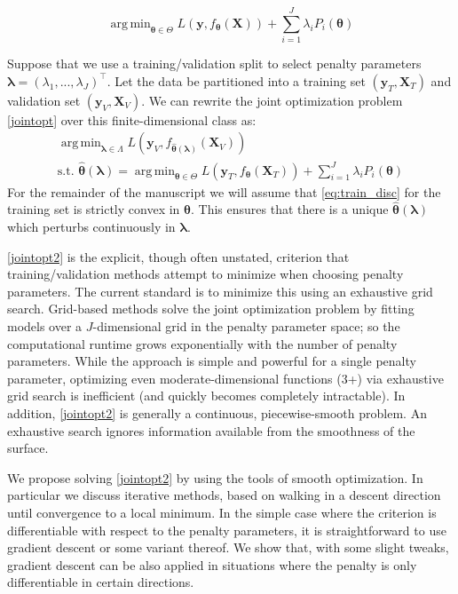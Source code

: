 \documentclass[12pt,letterpaper]{article}
\DeclareMathOperator*{\argmin}{arg\,min}
\begin{document}
\begin{equation}\label{eq:train_disc}
\argmin_{\boldsymbol \theta \in \Theta} L(\boldsymbol{y}, f_{\boldsymbol \theta}(\boldsymbol{X})) + \sum\limits_{i=1}^J \lambda_i P_i(\boldsymbol \theta)
\end{equation}

Suppose that we use a training/validation split to select penalty parameters $\boldsymbol{\lambda} = (\lambda_1, ..., \lambda_J)^\top$. Let the data be partitioned into a training set $(\boldsymbol{y}_T , \boldsymbol{X}_T)$ and validation set $(\boldsymbol{y}_V, \boldsymbol{X}_V)$. We can rewrite the joint optimization problem \eqref{jointopt} over this finite-dimensional class as:
\begin{equation}
\begin{array}{c}
\argmin_{\boldsymbol{\lambda} \in \Lambda} L(\boldsymbol{y}_V, f_{\hat{\boldsymbol \theta}(\boldsymbol{\lambda})}(\boldsymbol{X}_V)) \\
\text{s.t. } {\hat{\boldsymbol \theta}(\boldsymbol{\lambda})} = \argmin_{\boldsymbol \theta \in \Theta} L(\boldsymbol{y}_T, f_{\boldsymbol \theta} (\boldsymbol{X}_T)) + \sum\limits_{i=1}^J \lambda_i P_i(\boldsymbol \theta)
\end{array}
\label{jointopt2}
\end{equation}
For the remainder of the manuscript we will assume that \eqref{eq:train_disc} for the training set is strictly convex in $\boldsymbol \theta$. This ensures that there is a unique $\hat{\boldsymbol \theta}(\boldsymbol{\lambda})$ which perturbs continuously in $\boldsymbol{\lambda}$.

\eqref{jointopt2} is the explicit, though often unstated, criterion that training/validation methods attempt to minimize when choosing penalty parameters. The current standard is to minimize this using an exhaustive grid search. Grid-based methods solve the joint optimization problem by fitting models over a $J$-dimensional grid in the penalty parameter space; so the computational runtime grows exponentially with the number of penalty parameters. While the approach is simple and powerful for a single penalty parameter, optimizing even moderate-dimensional functions (3+) via exhaustive grid search is inefficient (and quickly becomes completely intractable).  In addition, \eqref{jointopt2} is generally a continuous, piecewise-smooth problem. An exhaustive search ignores information available from the smoothness of the surface.

We propose solving \eqref{jointopt2} by using the tools of smooth optimization. In particular we discuss iterative methods, based on walking in a descent direction until convergence to a local minimum. In the simple case where the criterion is differentiable with respect to the penalty parameters, it is straightforward to use gradient descent or some variant thereof. We show that, with some slight tweaks, gradient descent can be also applied in situations where the penalty is only differentiable in certain directions.
\end{document}
